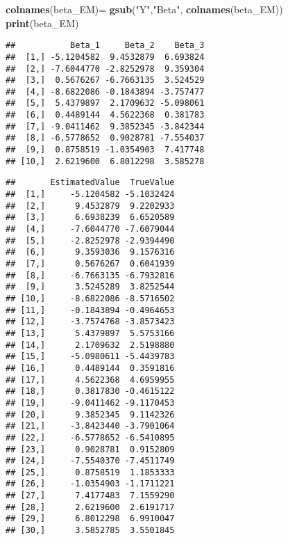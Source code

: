 \documentclass[
]{article}
\newenvironment{Shaded}{\begin{snugshade}}{\end{snugshade}}
\newcommand{\AttributeTok}[1]{\textcolor[rgb]{0.13,0.29,0.53}{#1}}
\newcommand{\FunctionTok}[1]{\textcolor[rgb]{0.13,0.29,0.53}{\textbf{#1}}}
\newcommand{\NormalTok}[1]{#1}
\newcommand{\OtherTok}[1]{\textcolor[rgb]{0.56,0.35,0.01}{#1}}
\newcommand{\SpecialCharTok}[1]{\textcolor[rgb]{0.81,0.36,0.00}{\textbf{#1}}}
\newcommand{\StringTok}[1]{\textcolor[rgb]{0.31,0.60,0.02}{#1}}
\begin{document}
\begin{Shaded}
\begin{Highlighting}[]
\FunctionTok{colnames}\NormalTok{(beta\_EM)}\OtherTok{=} \FunctionTok{gsub}\NormalTok{(}\StringTok{"Y"}\NormalTok{,}\StringTok{"Beta"}\NormalTok{, }\FunctionTok{colnames}\NormalTok{(beta\_EM))}
\FunctionTok{print}\NormalTok{(beta\_EM)}
\end{Highlighting}
\end{Shaded}

\begin{verbatim}
##           Beta_1     Beta_2    Beta_3
##  [1,] -5.1204582  9.4532879  6.693824
##  [2,] -7.6044770 -2.8252978  9.359304
##  [3,]  0.5676267 -6.7663135  3.524529
##  [4,] -8.6822086 -0.1843894 -3.757477
##  [5,]  5.4379897  2.1709632 -5.098061
##  [6,]  0.4489144  4.5622368  0.381783
##  [7,] -9.0411462  9.3852345 -3.842344
##  [8,] -6.5778652  0.9028781 -7.554037
##  [9,]  0.8758519 -1.0354903  7.417748
## [10,]  2.6219600  6.8012298  3.585278
\end{verbatim}

\begin{Shaded}
\end{Shaded}

\begin{verbatim}
##       EstimatedValue  TrueValue
##  [1,]     -5.1204582 -5.1032424
##  [2,]      9.4532879  9.2202933
##  [3,]      6.6938239  6.6520589
##  [4,]     -7.6044770 -7.6079044
##  [5,]     -2.8252978 -2.9394490
##  [6,]      9.3593036  9.1576316
##  [7,]      0.5676267  0.6041939
##  [8,]     -6.7663135 -6.7932816
##  [9,]      3.5245289  3.8252544
## [10,]     -8.6822086 -8.5716502
## [11,]     -0.1843894 -0.4964653
## [12,]     -3.7574768 -3.8573423
## [13,]      5.4379897  5.5753166
## [14,]      2.1709632  2.5198880
## [15,]     -5.0980611 -5.4439783
## [16,]      0.4489144  0.3591816
## [17,]      4.5622368  4.6959955
## [18,]      0.3817830 -0.4615122
## [19,]     -9.0411462 -9.1170453
## [20,]      9.3852345  9.1142326
## [21,]     -3.8423440 -3.7901064
## [22,]     -6.5778652 -6.5410895
## [23,]      0.9028781  0.9152809
## [24,]     -7.5540370 -7.4511749
## [25,]      0.8758519  1.1853333
## [26,]     -1.0354903 -1.1711221
## [27,]      7.4177483  7.1559290
## [28,]      2.6219600  2.6191717
## [29,]      6.8012298  6.9910047
## [30,]      3.5852785  3.5501845
\end{verbatim}
\end{document}
